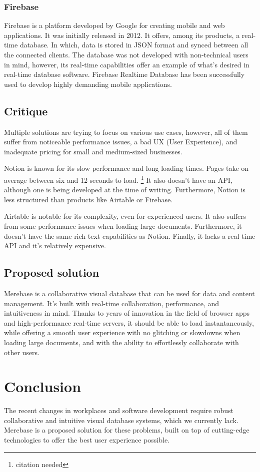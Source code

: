 \subsubsection{Firebase}

Firebase is a platform developed by Google for creating mobile and web
applications. It was initially released in 2012. It offers, among its
products, a real-time database. In which, data is stored in JSON format
and synced between all the connected clients. The database was not
developed with non-technical users in mind, however, its real-time
capabilities offer an example of what's desired in real-time database
software. Firebase Realtime Database has been successfully used to
develop highly demanding mobile applications.

\subsection{Critique}

Multiple solutions are trying to focus on various use cases, however,
all of them suffer from noticeable performance issues, a bad UX (User
Experience), and inadequate pricing for small and medium-sized
businesses.

Notion is known for its slow performance and long loading times. Pages
take on average between six and 12 seconds to load. \footnote{citation
	needed} It also doesn't have an API, although one is being developed
at the time of writing. Furthermore, Notion is less structured than
products like Airtable or Firebase.

Airtable is notable for its complexity, even for experienced users. It
also suffers from some performance issues when loading large documents.
Furthermore, it doesn't have the same rich text capabilities as Notion.
Finally, it lacks a real-time API and it's relatively expensive.

\subsection{Proposed solution}

Merebase is a collaborative visual database that can be used for data
and content management. It's built with real-time collaboration,
performance, and intuitiveness in mind. Thanks to years of innovation in
the field of browser apps and high-performance real-time servers, it
should be able to load instantaneously, while offering a smooth user
experience with no glitching or slowdowns when loading large documents,
and with the ability to effortlessly collaborate with other users.

\section{Conclusion}

The recent changes in workplaces and software development require robust
collaborative and intuitive visual database systems, which we currently
lack. Merebase is a proposed solution for these problems, built on top
of cutting-edge technologies to offer the best user experience possible.